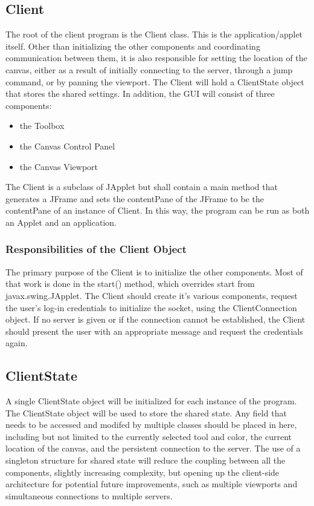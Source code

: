 \documentclass[11pt,oneside,a4paper]{article}
\begin{document}
 \subsection{Client}
  The root of the client program is the Client class. This is the
  application/applet itself. Other than initializing the other components and
  coordinating communication between them, it is also responsible for setting the
  location of the canvas, either as a result of initially connecting to the
  server, through a jump command, or by panning the viewport. The Client will
  hold a ClientState object that stores the shared settings. In addition, the GUI
  will consist of three components:
  \begin{itemize}
   \item the Toolbox
   \item the Canvas Control Panel
   \item the Canvas Viewport
  \end{itemize}
 The Client is a subclass of JApplet but shall contain a main method that
 generates a JFrame and sets the contentPane of the JFrame to be the
 contentPane of an instance of Client. In this way, the program can be run as
 both an Applet and an application.
 
 \subsubsection{Responsibilities of the Client Object}
The primary purpose of the Client is to initialize the other components. Most
of that work is done in the start() method, which overrides start from
javax.swing.JApplet. The Client should create it's various components, request
the user's log-in credentials to initialize the socket, using the
ClientConnection object. If no server is given or if the connection cannot be
established, the Client should present the user with an appropriate message and
request the credentials again.
 \subsection{ClientState}
  A single ClientState object will be initialized for each instance of the
  program. The ClientState object will be used to store the shared state. Any
  field that needs to be accessed and modifed by multiple classes should be
  placed in here, including but not limited to the currently selected tool and
  color, the current location of the canvas, and the persistent connection to the
  server. The use of a singleton structure for shared state will reduce the
  coupling between all the components, slightly increasing complexity, but
  opening up the client-side architecture for potential future improvements, such
  as multiple viewports and simultaneous connections to multiple servers.
\end{document}
